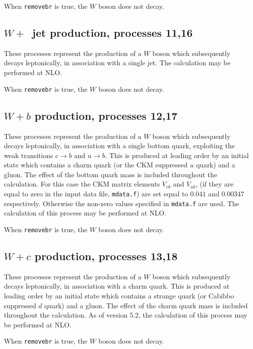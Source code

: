 \documentclass[12pt]{article}
\begin{document}
When {\tt removebr} is true, the $W$ boson does not decay.

\subsection{$W+$~jet production, processes 11,16}
\label{subsec:w1jet}

These processes represent the production of a $W$ boson which subsequently
decays leptonically, in association with a single jet.
The calculation may be performed at NLO.

When {\tt removebr} is true, the $W$ boson does not decay.

\subsection{$W+b$ production, processes 12,17}
\label{subsec:wb}

These processes represent the production of a $W$ boson which
subsequently decays leptonically, in association with a single bottom
quark, exploiting the weak transitions $c \to b$ and $u \to b$.
This is produced at leading order by an initial state which
contains a charm quark (or the CKM  suppressed $u$ quark) and a
gluon.  The effect of the bottom quark mass is included throughout the
calculation.  
For this case the CKM matrix elements $V_{cb}$ and $V_{ub}$,
(if they are equal to zero in the input data file, {\tt mdata.f})
are set equal to $0.041$ and $0.00347$ respectively. 
Otherwise the non-zero values specified in {\tt mdata.f} are used. 
The calculation of this process may
be performed at NLO.

When {\tt removebr} is true, the $W$ boson does not decay.

\subsection{$W+c$ production, processes 13,18}
\label{subsec:wc}

These processes represent the production of a $W$ boson which
subsequently decays leptonically, in association with a charm
quark. This is produced at leading order by an initial state which
contains a strange quark (or Cabibbo suppressed $d$ quark) and a
gluon.  The effect of the charm quark mass is included throughout the
calculation.  As of version 5.2, the calculation of this process may
be performed at NLO.

When {\tt removebr} is true, the $W$ boson does not decay.
\end{document}
